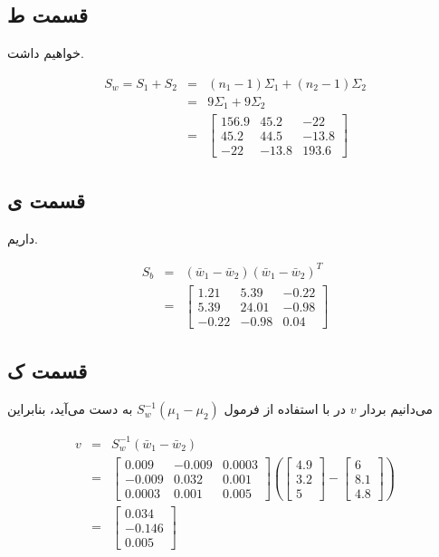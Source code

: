 \documentclass{article}
\begin{document}
\subsection*{قسمت ط}

خواهیم داشت.

\begin{eqnarray*}
    S_w = S_1 + S_2 & = & (n_1-1)\Sigma_1 + (n_2-1)\Sigma_2 \\
    & = & 9 \Sigma_1 + 9 \Sigma_2 \\
    & = & \begin{bmatrix}156.9 & 45.2 & -22\\ 45.2 & 44.5 & -13.8\\ -22 & -13.8 & 193.6\end{bmatrix}
\end{eqnarray*}

\subsection*{قسمت ی}

داریم.

\begin{eqnarray*}
    S_b & = & (\bar{w}_1 - \bar{w}_2)(\bar{w}_1 - \bar{w}_2)^T \\
    & = & \begin{bmatrix}1.21 & 5.39 & -0.22\\ 5.39 & 24.01 & -0.98\\ -0.22 & -0.98 & 0.04\end{bmatrix}
\end{eqnarray*}

\subsection*{قسمت ک}

می‌دانیم بردار $v$ در  با استفاده از فرمول $S_w^{-1} (\mu_1 - \mu_2)$ به دست می‌آید، بنابراین

\begin{eqnarray*}
    v & = & S_w^{-1} (\bar{w}_1 - \bar{w}_2) \\
    & = & \begin{bmatrix}0.009 & -0.009 & 0.0003\\ -0.009 & 0.032 & 0.001\\0.0003 & 0.001 & 0.005\end{bmatrix}(\begin{bmatrix}4.9\\ 3.2\\ 5\end{bmatrix} - \begin{bmatrix}6\\ 8.1\\ 4.8\end{bmatrix}) \\
    & = & \begin{bmatrix}0.034\\ -0.146\\ 0.005\end{bmatrix}
\end{eqnarray*}
\end{document}
